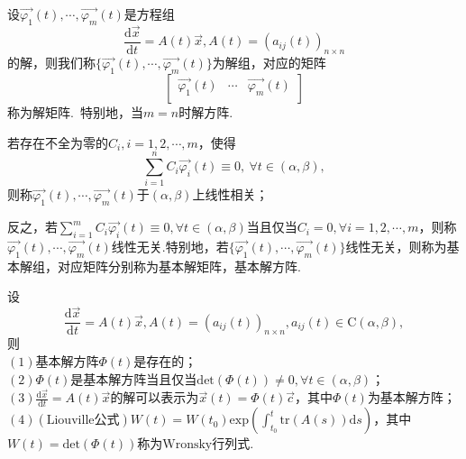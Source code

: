 \documentclass{ctexart}
\begin{document}
\begin{definition}
设$\vec{\varphi_{1}}(t),\cdots,\vec{\varphi_{m}}(t)$是方程组
$$\frac{\mathrm{d}\vec{x}}{\mathrm{d}t}=A(t)\vec{x},A(t)=(a_{ij}(t))_{n\times n}$$
的解，则我们称$\{\vec{\varphi_{1}}(t),\cdots,\vec{\varphi_{m}}(t)\}$为解组，对应的矩阵
$$\begin{bmatrix}\vec{\varphi_{1}}(t)&\cdots&\vec{\varphi_{m}}(t)\\\end{bmatrix}$$
称为解矩阵.~特别地，当$m=n$时解方阵.

若存在不全为零的$C_{i},i=1,2,\cdots,m$，使得
$$\sum\limits_{i=1}^{n}{C_{i}\vec{\varphi_{i}}(t)}\equiv 0,~\forall t\in(\alpha,\beta),$$
则称$\vec{\varphi_{1}}(t),\cdots,\vec{\varphi_{m}}(t)$于$(\alpha,\beta)$上线性相关；

反之，若$\sum\limits_{i=1}^{m}{C_{i}\vec{\varphi_{i}}(t)}\equiv 0,\forall t\in(\alpha,\beta)$当且仅当$C_{i}=0,\forall i=1,2,\cdots,m$，则称$\vec{\varphi_{1}}(t),\cdots,\vec{\varphi_{m}}(t)$线性无关.特别地，若$\{\vec{\varphi_{1}}(t),\cdots,\vec{\varphi_{m}}(t)\}$线性无关，则称为基本解组，对应矩阵分别称为基本解矩阵，基本解方阵.
\end{definition}

\begin{theorem}
设
$$\frac{\mathrm{d}\vec{x}}{\mathrm{d}t}=A(t)\vec{x},A(t)=(a_{ij}(t))_{n\times n},a_{ij}(t)\in\mathrm{C}(\alpha,\beta),$$
则\\
$(1)$基本解方阵$\Phi(t)$是存在的；\\
$(2)\Phi(t)$是基本解方阵当且仅当$\mathrm{det}(\Phi(t))\neq 0,\forall t\in(\alpha,\beta)$；\\
$(3)\frac{\mathrm{d}\vec{x}}{\mathrm{d}t}=A(t)\vec{x}$的解可以表示为$\vec{x}(t)=\Phi(t)\vec{c}$，其中$\Phi(t)$为基本解方阵；\\
$(4)(\mathrm{Liouville}\text{公式})W(t)=W(t_{0})\mathrm{exp}\left(\int_{t_{0}}^{t}{\mathrm{tr}(A(s))\mathrm{d}s}\right)$，其中$W(t)=\mathrm{det}(\Phi(t))$称为$\mathrm{Wronsky}$行列式.
\end{theorem}
\end{document}
